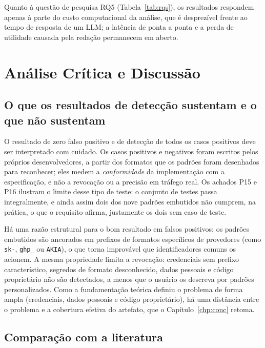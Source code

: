 Quanto à questão de pesquisa RQ5 (Tabela~\ref{tab:rqs}), os resultados respondem apenas à parte do custo computacional da análise, que é desprezível frente ao tempo de resposta de um LLM; a latência de ponta a ponta e a perda de utilidade causada pela redação permanecem em aberto.

\section{Análise Crítica e Discussão}
\label{sec:res_discussao}

\subsection{O que os resultados de detecção sustentam e o que não sustentam}

O resultado de zero falso positivo e de detecção de todos os casos positivos deve ser interpretado com cuidado. Os casos positivos e negativos foram escritos pelos próprios desenvolvedores, a partir dos formatos que os padrões foram desenhados para reconhecer; eles medem a \textit{conformidade} da implementação com a especificação, e não a revocação ou a precisão em tráfego real. Os achados P15 e P16 ilustram o limite desse tipo de teste: o conjunto de testes passa integralmente, e ainda assim dois dos nove padrões embutidos não cumprem, na prática, o que o requisito afirma, justamente os dois sem caso de teste.

Há uma razão estrutural para o bom resultado em falsos positivos: os padrões embutidos são ancorados em prefixos de formatos específicos de provedores (como \texttt{sk-}, \texttt{ghp\_} ou \texttt{AKIA}), o que torna improvável que identificadores comuns os acionem. A mesma propriedade limita a revocação: credenciais sem prefixo característico, segredos de formato desconhecido, dados pessoais e código proprietário não são detectados, a menos que o usuário os descreva por padrões personalizados. Como a fundamentação teórica definiu o problema de forma ampla (credenciais, dados pessoais e código proprietário), há uma distância entre o problema e a cobertura efetiva do artefato, que o Capítulo~\ref{chp:conc} retoma.

\subsection{Comparação com a literatura}

